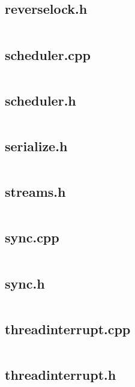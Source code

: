 \documentclass{article}
\begin{document}
\subsection{reverselock.h}
\inputminted{cpp}{/home/dufferzafar/dev/@clones/bitcoin/src/reverselock.h}
\newpage

\subsection{scheduler.cpp}
\inputminted{cpp}{/home/dufferzafar/dev/@clones/bitcoin/src/scheduler.cpp}
\newpage

\subsection{scheduler.h}
\inputminted{cpp}{/home/dufferzafar/dev/@clones/bitcoin/src/scheduler.h}
\newpage

\subsection{serialize.h}
\inputminted{cpp}{/home/dufferzafar/dev/@clones/bitcoin/src/serialize.h}
\newpage

\subsection{streams.h}
\inputminted{cpp}{/home/dufferzafar/dev/@clones/bitcoin/src/streams.h}
\newpage

\subsection{sync.cpp}
\inputminted{cpp}{/home/dufferzafar/dev/@clones/bitcoin/src/sync.cpp}
\newpage

\subsection{sync.h}
\inputminted{cpp}{/home/dufferzafar/dev/@clones/bitcoin/src/sync.h}
\newpage

\subsection{threadinterrupt.cpp}
\inputminted{cpp}{/home/dufferzafar/dev/@clones/bitcoin/src/threadinterrupt.cpp}
\newpage

\subsection{threadinterrupt.h}
\inputminted{cpp}{/home/dufferzafar/dev/@clones/bitcoin/src/threadinterrupt.h}
\newpage
\end{document}
